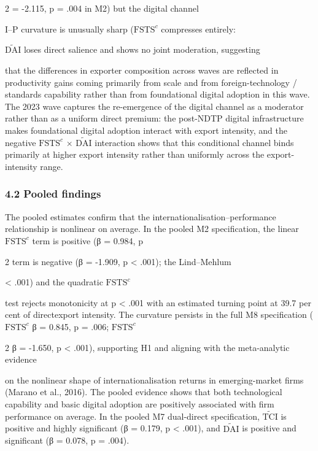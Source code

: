 \documentclass[12pt,a4paper]{article}
\begin{document}
2 = -2.115, p = .004 in M2) but the digital channel

I--P curvature is unusually sharp (\(\mathrm{FSTS}^{c}\) compresses
entirely:

\(\tilde{\mathrm{DAI}}\) loses direct salience and shows no joint
moderation, suggesting

that the differences in exporter composition across waves are reflected
in productivity gains coming primarily from scale and from
foreign-technology / standards capability rather than from foundational
digital adoption in this wave. The 2023 wave captures the re-emergence
of the digital channel as a moderator rather than as a uniform direct
premium: the post-NDTP digital infrastructure makes foundational digital
adoption interact with export intensity, and the negative
\(\mathrm{FSTS}^{c}\) × \(\tilde{\mathrm{DAI}}\) interaction shows that
this conditional channel binds primarily at higher export intensity
rather than uniformly across the export-intensity range.

\hypertarget{42-pooled-findings}{%
\subsubsection{4.2 Pooled findings}\label{42-pooled-findings}}

The pooled estimates confirm that the internationalisation--performance
relationship is nonlinear on average. In the pooled M2 specification,
the linear \(\mathrm{FSTS}^{c}\) term is positive (β = 0.984, p

2 term is negative (β = -1.909, p \textless{} .001); the Lind--Mehlum

\textless{} .001) and the quadratic \(\mathrm{FSTS}^{c}\)

test rejects monotonicity at p \textless{} .001 with an estimated
turning point at 39.7 per cent of directexport intensity. The curvature
persists in the full M8 specification (\(\mathrm{FSTS}^{c}\) β = 0.845,
p = .006; \(\mathrm{FSTS}^{c}\)

2 β = -1.650, p \textless{} .001), supporting H1 and aligning with the
meta-analytic evidence

on the nonlinear shape of internationalisation returns in
emerging-market firms (Marano et al., 2016). The pooled evidence shows
that both technological capability and basic digital adoption are
positively associated with firm performance on average. In the pooled M7
dual-direct specification, \(\tilde{\mathrm{TCI}}\) is positive and
highly significant (β = 0.179, p \textless{} .001), and
\(\tilde{\mathrm{DAI}}\) is positive and significant (β = 0.078, p =
.004).
\end{document}
